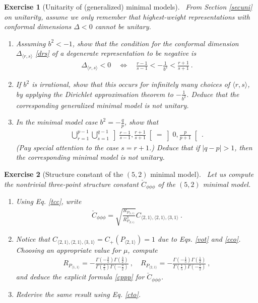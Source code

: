 \documentclass[12pt, a4paper, notitlepage, twoside]{report}
\numberwithin{equation}{section}
\theoremstyle{break}
\newtheorem{exo}{Exercise}[chapter]
\begin{document}
\begin{exo}[Unitarity of (generalized) minimal models]
 ~\label{exoneg}
From Section \ref{secuni} on unitarity, assume we only remember that highest-weight representations with conformal dimensions $\Delta <0$ cannot be unitary. 
\begin{enumerate}
 \item 
Assuming $b^2 < -1$, show that the condition for the conformal dimension $\Delta_{\langle r,s \rangle}$ \eqref{drs} of a degenerate representation to be negative is 
\begin{align}
 \Delta_{\langle r,s \rangle} < 0 \quad \iff \quad \frac{r-1}{s-1} < -\frac{1}{b^2} < \frac{r+1}{s+1} \ .
\end{align}
\item
If $b^2$ is irrational, show that this occurs for infinitely many choices of $\langle r,s \rangle$, by applying the Dirichlet approximation theorem to $-\frac{1}{b^2}$. 
Deduce that the corresponding generalized minimal model is not unitary. 
\item
In the minimal model case $b^2 = -\frac{q}{p}$, show that 
\begin{align}
 \bigcup_{r=1}^{p-1}\bigcup_{s=1}^{q-1} \left] \frac{r-1}{s-1} , \frac{r+1}{s+1} \right[  = \left]0, \frac{p}{p+1}\right[ \ .
\end{align}
(Pay special attention to the case $s=r+1$.) Deduce that if $|q-p|>1$, then the corresponding minimal model is not unitary.
\end{enumerate}
\end{exo}

\begin{exo}[Structure constant of the $(5,2)$ minimal model]
 ~\label{exocppp}
 Let us compute the nontrivial three-point structure constant $\check{C}_{\phi\phi\phi}$ of the $(5,2)$ minimal model.
 \begin{enumerate}
  \item Using Eq. \eqref{tcc}, write
\begin{align}
 \check{C}_{\phi\phi\phi} = \sqrt{\frac{R_{P_{\langle 1,1 \rangle}}}{R_{P_{\langle 2,1 \rangle}}^3}} C_{\langle 2,1\rangle , \langle 2,1 \rangle,\langle 3,1 \rangle}\ .
\end{align}
\item Notice that $C_{\langle 2,1\rangle , \langle 2,1 \rangle,\langle 3,1 \rangle} = C_+(P_{\langle 2,1 \rangle})=1$ due to Eqs. \eqref{vot} and \eqref{cco}.
Choosing an appropriate value for $\mu$, compute
\begin{align}
 R_{P_{\langle 1,1 \rangle}} = -\frac{\Gamma(-\frac35)\Gamma(\frac32)}{\Gamma(\frac35)\Gamma(-\frac32)} \ , \quad R_{P_{\langle 2,1 \rangle}} = -\frac{\Gamma(-\frac15)\Gamma(\frac12)}{\Gamma(\frac15)\Gamma(-\frac12)}\ , 
\end{align}
and deduce the explicit formula \eqref{cppp} for $\check{C}_{\phi\phi\phi}$.
\item Rederive the same result using Eq. \eqref{cto}.
 \end{enumerate}


\end{exo}
\end{document}
